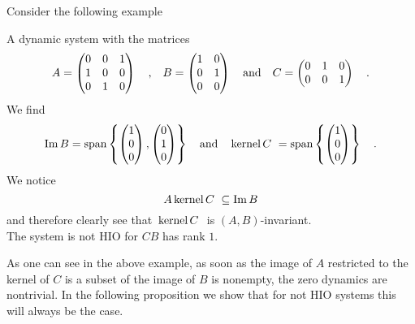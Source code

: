 Consider the following example
\begin{example}{}{}
	A dynamic system with the matrices
	\begin{equation}
	A = \begin{pmatrix}
	0 & 0 & 1 \\ 1 & 0 & 0 \\ 0 & 1 & 0
	\end{pmatrix}		 \quad \text{,} \quad
	B = \begin{pmatrix}
	1 & 0 \\ 0 & 1 \\ 0 & 0
	\end{pmatrix}
	\quad \text{and} \quad C =
	\begin{pmatrix}
	0 & 1 & 0 \\ 0 & 0 & 1
	\end{pmatrix} \quad .
	\end{equation}
	We find
	\begin{equation}
	\text{Im}\,B = \text{span} \left\{
	\begin{pmatrix} 1 \\ 0 \\ 0 \end{pmatrix} ,
	\begin{pmatrix} 0 \\ 1 \\ 0 \end{pmatrix}
	\right\} \quad \text{and} \quad
	 \, \text{kernel}\,C \,\, = \text{span} \left\{
	\begin{pmatrix} 1 \\ 0 \\ 0 \end{pmatrix}
	\right\}  \quad .
	\end{equation}
	We notice 
	\begin{equation}
	A  \, \text{kernel}\,C \,\, \subseteq \text{Im}\, B
	\end{equation}	
	and therefore clearly see that $ \, \text{kernel}\,C \,\,$ is $(A,B)$-invariant.\\
	The system is not HIO for $CB$ has rank $1$.
	\end{example}
	As one can see in the above example, as soon as the image of $A$ restricted to the 
	kernel of $C$ is a subset of the image of $B$ is nonempty, the zero dynamics are 
	nontrivial. In the following proposition we show that for not HIO systems this will 
	always be the case.

